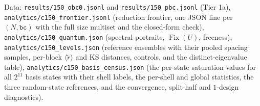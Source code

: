 \documentclass[11pt]{article}
\newcommand{\rt}[1]{\texttt{#1}}
\newcommand{\fn}[1]{\texttt{#1}}
\newcommand{\Fix}{\operatorname{Fix}}
\theoremstyle{plain}
\theoremstyle{definition}
\begin{document}
\begin{sloppypar}
Data: \fn{results/150\_obc0.jsonl} and \fn{results/150\_pbc.jsonl} (Tier 1a),
\fn{analytics/c150\_frontier.jsonl} (reduction frontier, one JSON line per
$(N,\rt{bc})$ with the full size multiset and the closed-form check),
\fn{analytics/c150\_quantum.json} (spectral portraits, $\Fix(U)$, freeness),
\fn{analytics/c150\_levels.json} (reference ensembles with their pooled spacing
samples, per-block $\langle\tilde r\rangle$ and KS distances, controls, and the
distinct-eigenvalue table),
\fn{analytics/c150\_basis\_census.json} (the per-state saturation values for all
$2^{11}$ basis states with their shell labels, the per-shell and global
statistics, the three random-state references, and the convergence, split-half
and $1$-design diagnostics).
\end{sloppypar}
\end{document}
